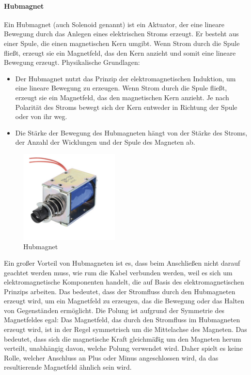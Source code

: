 \paragraph{Hubmagnet}
Ein Hubmagnet (auch Solenoid genannt) ist ein Aktuator, der eine lineare Bewegung durch das Anlegen eines elektrischen
Stroms erzeugt. Er besteht aus einer Spule, die einen magnetischen Kern umgibt. Wenn Strom durch die Spule fließt, erzeugt
sie ein Magnetfeld, das den Kern anzieht und somit eine lineare Bewegung erzeugt.\newline
Physikalische Grundlagen:
\begin{itemize}
	\item Der Hubmagnet nutzt das Prinzip der elektromagnetischen Induktion, um eine lineare Bewegung zu erzeugen. Wenn Strom
	durch die Spule fließt, erzeugt sie ein Magnetfeld, das den magnetischen Kern anzieht. Je nach Polarität des Stroms bewegt
	sich der Kern entweder in Richtung der Spule oder von ihr weg.
	\item Die Stärke der Bewegung des Hubmagneten hängt von der Stärke des Stroms, der Anzahl der Wicklungen und der
	Spule des Magneten ab.
\end{itemize}
\begin{figure}[htbp]
	\centering
	\includegraphics[width=5cm]{img/Hubmagnet}
	\caption{Hubmagnet}
	\label{fig:Hubmagnet}
\end{figure}

Ein großer Vorteil von Hubmagneten ist es, dass beim Anschließen nicht darauf geachtet werden muss, wie rum die
Kabel verbunden werden, weil es
sich um elektromagnetische Komponenten handelt, die auf Basis des elektromagnetischen Prinzips arbeiten. Das bedeutet,
dass der Stromfluss durch den Hubmagneten erzeugt wird, um ein Magnetfeld zu erzeugen, das die Bewegung oder das Halten
von Gegenständen ermöglicht.
Die Polung ist aufgrund der Symmetrie des Magnetfeldes egal:
Das Magnetfeld, das durch den Stromfluss im Hubmagneten erzeugt wird, ist in der Regel
symmetrisch um die Mittelachse des Magneten. Das bedeutet, dass sich die magnetische Kraft gleichmäßig um den Magneten herum
verteilt, unabhängig davon, welche Polung verwendet wird. Daher spielt es keine Rolle, welcher Anschluss an Plus oder Minus
angeschlossen wird, da das resultierende Magnetfeld ähnlich sein wird.

